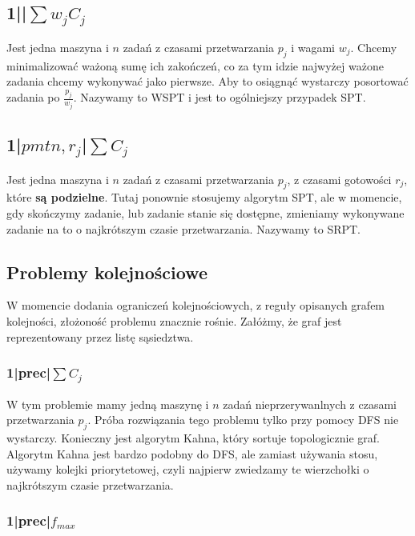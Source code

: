 \documentclass{../notatki}
\begin{document}
\subsection{1||\texorpdfstring{$\sum w_jC_j$}{sum wjCj}}

Jest jedna maszyna i $n$ zadań z czasami przetwarzania $p_j$ i wagami $w_j$.
Chcemy minimalizować ważoną sumę ich zakończeń, co za tym idzie najwyżej ważone
zadania chcemy wykonywać jako pierwsze. Aby to osiągnąć wystarczy posortować
zadania po $\frac{p_j}{w_j}$. Nazywamy to WSPT i jest to ogólniejszy przypadek
SPT.

\subsection{1|\texorpdfstring{$pmtn, r_j$}{pmtn,
rj}|\texorpdfstring{$\sum C_j$}{sum Cj}}

Jest jedna maszyna i $n$ zadań z czasami przetwarzania $p_j$, z
czasami gotowości
$r_j$, które \textbf{są podzielne}. Tutaj ponownie stosujemy algorytm SPT,
ale w momencie, gdy skończymy zadanie, lub zadanie stanie się dostępne,
zmieniamy wykonywane zadanie na to o najkrótszym czasie przetwarzania.
Nazywamy to SRPT.

\subsection{Problemy kolejnościowe}

W momencie dodania ograniczeń kolejnościowych, z reguły opisanych grafem
kolejności, złożoność problemu znacznie rośnie. Załóżmy, że graf
jest reprezentowany przez listę sąsiedztwa.

\subsubsection{1|prec|\texorpdfstring{$\sum C_j$}{sum Cj}}

W tym problemie mamy jedną maszynę i $n$ zadań nieprzerywanlnych z
czasami przetwarzania $p_j$.
Próba rozwiązania tego problemu tylko przy pomocy DFS nie wystarczy.
Konieczny jest algorytm Kahna, który sortuje topologicznie graf.
Algorytm Kahna jest bardzo podobny do DFS, ale zamiast używania stosu,
używamy kolejki priorytetowej, czyli najpierw zwiedzamy te wierzchołki o
najkrótszym czasie przetwarzania.

\subsubsection{1|prec|\texorpdfstring{$f_{max}$}{fmax}}
\end{document}
